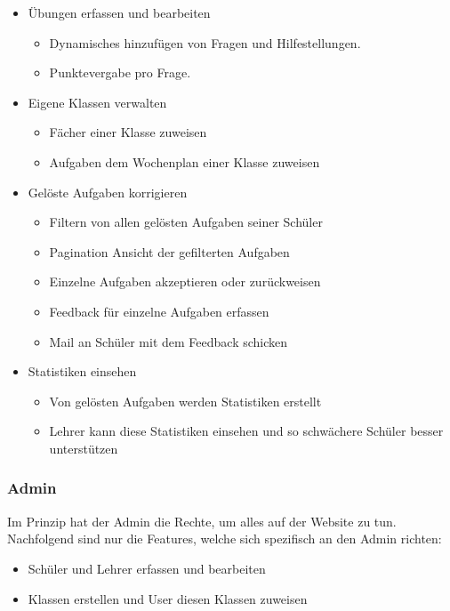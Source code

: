 \begin{itemize}
	\item Übungen erfassen und bearbeiten
	\begin{itemize}
		\item Dynamisches hinzufügen von Fragen und Hilfestellungen.
		\item Punktevergabe pro Frage.
	\end{itemize}
	\item Eigene Klassen verwalten
	\begin{itemize}
		\item Fächer einer Klasse zuweisen
		\item Aufgaben dem Wochenplan einer Klasse zuweisen
	\end{itemize}
	\item Gelöste Aufgaben korrigieren
	\begin{itemize}
		\item Filtern von allen gelösten Aufgaben seiner Schüler
		\item Pagination Ansicht der gefilterten Aufgaben
		\item Einzelne Aufgaben akzeptieren oder zurückweisen
		\item Feedback für einzelne Aufgaben erfassen
		\item Mail an Schüler mit dem Feedback schicken
	\end{itemize}
	\item Statistiken einsehen
	\begin{itemize}
		\item Von gelösten Aufgaben werden Statistiken erstellt
		\item Lehrer kann diese Statistiken einsehen und so schwächere Schüler besser unterstützen
	\end{itemize}
\end{itemize}


\subsubsection*{Admin}
Im Prinzip hat der Admin die Rechte, um alles auf der Website zu tun. Nachfolgend sind nur die Features, welche sich spezifisch an den Admin richten:

\begin{itemize}
	\item Schüler und Lehrer erfassen und bearbeiten
	\item Klassen erstellen und User diesen Klassen zuweisen
\end{itemize}


